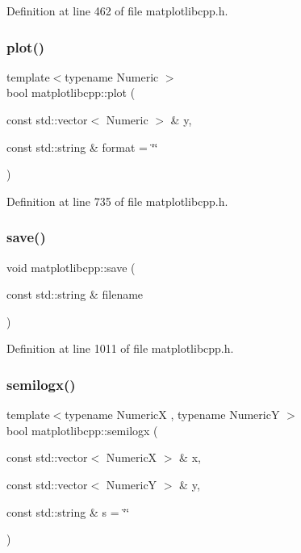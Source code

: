 Definition at line 462 of file matplotlibcpp.\+h.

\mbox{\label{namespacematplotlibcpp_a92c59dd37fb3f355514d88e364ddfde9}} 
\subsubsection{\texorpdfstring{plot()}{plot()}\hspace{0.1cm}{\footnotesize\ttfamily [3/3]}}
{\footnotesize\ttfamily template$<$typename Numeric $>$ \\
bool matplotlibcpp\+::plot (\begin{DoxyParamCaption}\item[{const std\+::vector$<$ Numeric $>$ \&}]{y,  }\item[{const std\+::string \&}]{format = {\ttfamily \char`\"{}\char`\"{}} }\end{DoxyParamCaption})}



Definition at line 735 of file matplotlibcpp.\+h.

\mbox{\label{namespacematplotlibcpp_a46a2869ed7cd834e93125a20e2a294c2}} 
\subsubsection{\texorpdfstring{save()}{save()}}
{\footnotesize\ttfamily void matplotlibcpp\+::save (\begin{DoxyParamCaption}\item[{const std\+::string \&}]{filename }\end{DoxyParamCaption})\hspace{0.3cm}{\ttfamily [inline]}}



Definition at line 1011 of file matplotlibcpp.\+h.

\mbox{\label{namespacematplotlibcpp_ad25d4429577dbdd8c087a0ba6869840b}} 
\subsubsection{\texorpdfstring{semilogx()}{semilogx()}}
{\footnotesize\ttfamily template$<$typename NumericX , typename NumericY $>$ \\
bool matplotlibcpp\+::semilogx (\begin{DoxyParamCaption}\item[{const std\+::vector$<$ NumericX $>$ \&}]{x,  }\item[{const std\+::vector$<$ NumericY $>$ \&}]{y,  }\item[{const std\+::string \&}]{s = {\ttfamily \char`\"{}\char`\"{}} }\end{DoxyParamCaption})}



